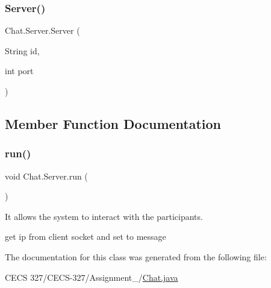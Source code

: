 \subsubsection{\texorpdfstring{Server()}{Server()}}
{\footnotesize\ttfamily Chat.\+Server.\+Server (\begin{DoxyParamCaption}\item[{String}]{id,  }\item[{int}]{port }\end{DoxyParamCaption})}



\subsection{Member Function Documentation}
\hypertarget{class_chat_1_1_server_a90f3bd24ca99aa3ebf510d1f41b245c3}{}\label{class_chat_1_1_server_a90f3bd24ca99aa3ebf510d1f41b245c3} 
\subsubsection{\texorpdfstring{run()}{run()}}
{\footnotesize\ttfamily void Chat.\+Server.\+run (\begin{DoxyParamCaption}{ }\end{DoxyParamCaption})}



It allows the system to interact with the participants. 

get ip from client socket and set to message 

The documentation for this class was generated from the following file\+:\begin{DoxyCompactItemize}
\item 
C\+E\+C\+S 327/\+C\+E\+C\+S-\/327/\+Assignment\+\_/\hyperlink{_chat_8java}{Chat.\+java}\end{DoxyCompactItemize}
